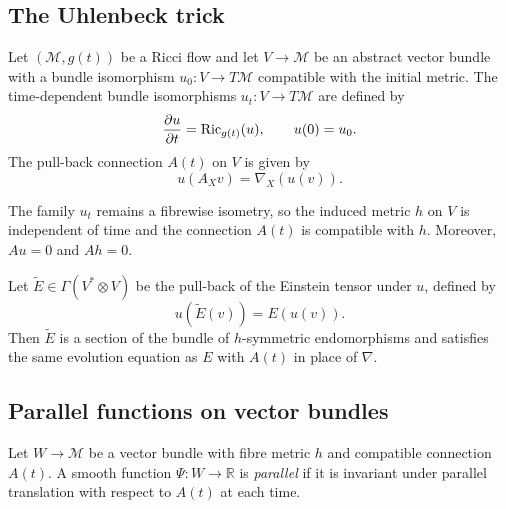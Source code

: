 \subsection{The Uhlenbeck trick}

\begin{definition}
\label{topping-ch9-uhlenbeck-setup}
Let \((\mathcal M,g(t))\) be a Ricci flow and let \(V\to\mathcal M\) be an
abstract vector bundle with a bundle isomorphism \(u_0:V\to T\mathcal M\)
compatible with the initial metric. The time-dependent bundle isomorphisms
\(u_t:V\to T\mathcal M\) are defined by
\[
\frac{\partial u}{\partial t}=\operatorname{Ric}_{g(t)}(u),\qquad u(0)=u_0.
\]
The pull-back connection \(A(t)\) on \(V\) is given by
\[
u(A_X v)=\nabla_X(u(v)).
\]
\end{definition}

\begin{remark}
\label{topping-ch9-uhlenbeck-metric}
The family \(u_t\) remains a fibrewise isometry, so the induced metric \(h\)
on \(V\) is independent of time and the connection \(A(t)\) is compatible with
\(h\). Moreover, \(Au=0\) and \(Ah=0\).
\end{remark}

\begin{definition}
\label{topping-ch9-pulled-back-einstein}
Let \(\widetilde E\in\Gamma(V^*\otimes V)\) be the pull-back of the Einstein
tensor under \(u\), defined by
\[
u(\widetilde E(v))=E(u(v)).
\]
Then \(\widetilde E\) is a section of the bundle of \(h\)-symmetric endomorphisms
and satisfies the same evolution equation as \(E\) with \(A(t)\) in place of
\(\nabla\).
\end{definition}

\subsection{Parallel functions on vector bundles}

\begin{definition}
\label{topping-ch9-parallel-function}
Let \(W\to\mathcal M\) be a vector bundle with fibre metric \(h\) and
compatible connection \(A(t)\). A smooth function \(\Psi:W\to\mathbb R\) is
\emph{parallel} if it is invariant under parallel translation with respect to
\(A(t)\) at each time.
\end{definition}

